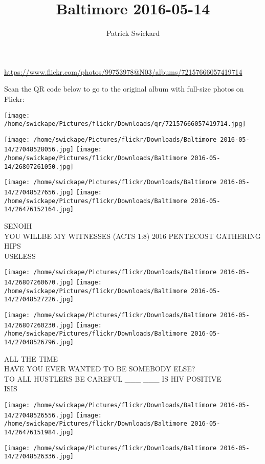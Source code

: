\documentclass[10pt,letterpaper]{article}
\title{Baltimore 2016-05-14}
\author{Patrick Swickard}
\date{}
\begin{document}
\maketitle

\url{https://www.flickr.com/photos/99753978@N03/albums/72157666057419714}

Scan the QR code below to go to the original album with full-size photos on Flickr:

\texttt{[image: /home/swickape/Pictures/flickr/Downloads/qr/72157666057419714.jpg]}
\pagebreak

\texttt{[image: /home/swickape/Pictures/flickr/Downloads/Baltimore 2016-05-14/27048528056.jpg]}
\texttt{[image: /home/swickape/Pictures/flickr/Downloads/Baltimore 2016-05-14/26807261050.jpg]}

\texttt{[image: /home/swickape/Pictures/flickr/Downloads/Baltimore 2016-05-14/27048527656.jpg]}
\texttt{[image: /home/swickape/Pictures/flickr/Downloads/Baltimore 2016-05-14/26476152164.jpg]}

SENOIH\\
YOU WILLBE MY WITNESSES (ACTS 1:8) 2016 PENTECOST GATHERING\\
HIPS\\
USELESS
\pagebreak

\texttt{[image: /home/swickape/Pictures/flickr/Downloads/Baltimore 2016-05-14/26807260670.jpg]}
\texttt{[image: /home/swickape/Pictures/flickr/Downloads/Baltimore 2016-05-14/27048527226.jpg]}

\texttt{[image: /home/swickape/Pictures/flickr/Downloads/Baltimore 2016-05-14/26807260230.jpg]}
\texttt{[image: /home/swickape/Pictures/flickr/Downloads/Baltimore 2016-05-14/27048526796.jpg]}

ALL THE TIME\\
HAVE YOU EVER WANTED TO BE SOMEBODY ELSE?\\
TO ALL HUSTLERS BE CAREFUL \_\_\_ \_\_\_ IS HIV POSITIVE\\
ISIS
\pagebreak

\texttt{[image: /home/swickape/Pictures/flickr/Downloads/Baltimore 2016-05-14/27048526556.jpg]}
\texttt{[image: /home/swickape/Pictures/flickr/Downloads/Baltimore 2016-05-14/26476151984.jpg]}

\texttt{[image: /home/swickape/Pictures/flickr/Downloads/Baltimore 2016-05-14/27048526336.jpg]}
\end{document}
